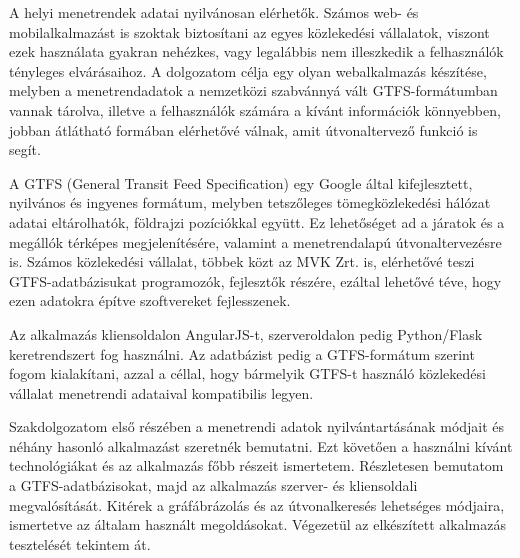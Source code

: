 
A helyi menetrendek adatai nyilvánosan elérhetők. Számos web- és mobilalkalmazást is szoktak biztosítani az egyes közlekedési vállalatok, viszont ezek használata gyakran nehézkes, vagy legalábbis nem illeszkedik a felhasználók tényleges elvárásaihoz. A dolgozatom célja egy olyan webalkalmazás készítése, melyben a menetrendadatok a nemzetközi szabvánnyá vált GTFS-formátumban vannak tárolva, illetve a felhasználók számára a kívánt információk könnyebben, jobban átlátható formában elérhetővé válnak, amit útvonaltervező funkció is segít.

A GTFS (General Transit Feed Specification) egy Google által kifejlesztett, nyilvános és ingyenes formátum, melyben tetszőleges tömegközlekedési hálózat adatai eltárolhatók, földrajzi pozíciókkal együtt. Ez lehetőséget ad a járatok és a megállók térképes megjelenítésére, valamint a menetrendalapú útvonaltervezésre is. Számos közlekedési vállalat, többek közt az MVK Zrt. is, elérhetővé teszi GTFS-adatbázisukat programozók, fejlesztők részére, ezáltal lehetővé téve, hogy ezen adatokra építve szoftvereket fejlesszenek.

Az alkalmazás kliensoldalon AngularJS-t, szerveroldalon pedig Python/Flask keretrendszert fog használni. Az adatbázist pedig a GTFS-formátum szerint fogom kialakítani, azzal a céllal, hogy bármelyik GTFS-t használó közlekedési vállalat menetrendi adataival kompatibilis legyen.

Szakdolgozatom első részében a menetrendi adatok nyilvántartásának módjait és néhány hasonló alkalmazást szeretnék bemutatni. Ezt követően a használni kívánt technológiákat és az alkalmazás főbb részeit ismertetem. Részletesen bemutatom a GTFS-adatbázisokat, majd az alkalmazás szerver- és kliensoldali megvalósítását. Kitérek a gráfábrázolás és az útvonalkeresés lehetséges módjaira, ismertetve az általam használt megoldásokat. Végezetül az elkészített alkalmazás tesztelését tekintem át.
